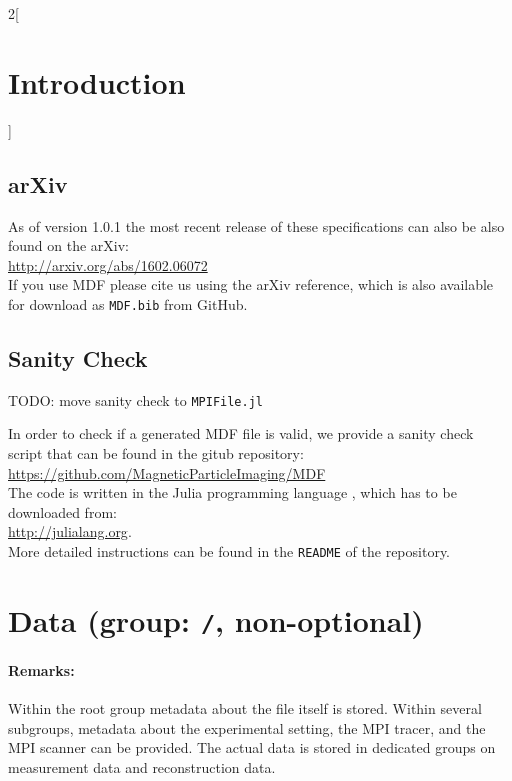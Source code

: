 \documentclass[landscape,a4paper]{article} %
\newcommand{\inl}[1]{\lstinline[columns=fixed]{#1}}
\begin{document}
\begin{multicols}{2}[\section{Introduction} \label{Sec:Introduction}]
\subsection{arXiv}
As of version 1.0.1 the most recent release of these specifications can also be also found on the arXiv:\\
\hspace*{1cm}\url{http://arxiv.org/abs/1602.06072}\\
If you use MDF please cite us using the arXiv reference, which is also available for download as \texttt{MDF.bib} from GitHub.

\subsection{Sanity Check}

TODO: move sanity check to \inl{MPIFile.jl}

In order to check if a generated MDF file is valid, we provide a sanity check script that can be found in the gitub repository:\\
\hspace*{1cm}\url{https://github.com/MagneticParticleImaging/MDF}\\
The code is written in the Julia programming language \cite{Bezanson2012,Bezanson2014,Bezanson2014a}, which has to be downloaded from: \\
\hspace*{1cm} \url{http://julialang.org}.\\
More detailed instructions can be found in the \texttt{README} of the repository.

\end{multicols}


\section{Data (group: \inl{/}, non-optional)}
 \setlength\extrarowheight{5pt}

\begin{multicols}{2}
\paragraph{Remarks:} Within the root group metadata about the file itself is stored. Within several subgroups, metadata about the experimental setting, the MPI tracer, and the MPI scanner can be provided. The actual data is stored in dedicated groups on measurement data and reconstruction data.
\end{multicols}
\end{document}
